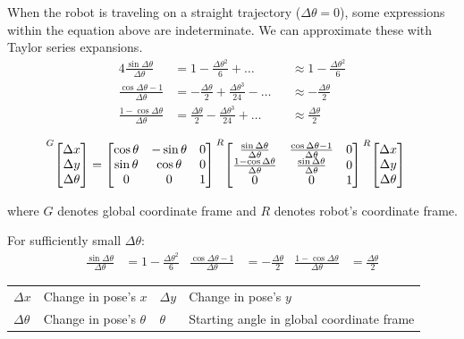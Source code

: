 When the robot is traveling on a straight trajectory ($\Delta\theta = 0$), some
expressions within the equation above are indeterminate. We can approximate
these with Taylor series expansions.
\begin{alignat*}{4}
  \frac{\sin\Delta\theta}{\Delta\theta}
    &= 1 - \frac{\Delta\theta^2}{6} + \ldots
    &&\approx 1 - \frac{\Delta\theta^2}{6} \\
  \frac{\cos\Delta\theta - 1}{\Delta\theta}
    &= -\frac{\Delta\theta}{2} + \frac{\Delta\theta^3}{24} - \ldots
    &&\approx -\frac{\Delta\theta}{2} \\
  \frac{1 - \cos\Delta\theta}{\Delta\theta}
    &= \frac{\Delta\theta}{2} - \frac{\Delta\theta^3}{24} + \ldots
    &&\approx \frac{\Delta\theta}{2}
\end{alignat*}
\begin{theorem}
  \begin{align}
    \prescript{G}{}{\begin{bmatrix}
      \Delta x \\
      \Delta y \\
      \Delta \theta
    \end{bmatrix}} &=
    \begin{bmatrix}
      \cos\theta & -\sin\theta & 0 \\
      \sin\theta &  \cos\theta & 0 \\
               0 &           0 & 1
    \end{bmatrix}
    \prescript{R}{}{\begin{bmatrix}
      \frac{\sin\Delta\theta}{\Delta\theta} &
        \frac{\cos\Delta\theta - 1}{\Delta\theta} & 0 \\
      \frac{1 - \cos\Delta\theta}{\Delta\theta} &
        \frac{\sin\Delta\theta}{\Delta\theta} & 0 \\
      0 & 0 & 1
    \end{bmatrix}}
    \prescript{R}{}{\begin{bmatrix}
      \Delta x \\
      \Delta y \\
      \Delta\theta
    \end{bmatrix}}
  \end{align}

  where $G$ denotes global coordinate frame and $R$ denotes robot's coordinate
  frame.

  For sufficiently small $\Delta\theta$:
  \begin{align}
    \frac{\sin\Delta\theta}{\Delta\theta} &= 1 - \frac{\Delta\theta^2}{6} &
    \frac{\cos\Delta\theta - 1}{\Delta\theta} &= -\frac{\Delta\theta}{2} &
    \frac{1 - \cos\Delta\theta}{\Delta\theta} &= \frac{\Delta\theta}{2}
  \end{align}
  \begin{figurekey}
    \begin{tabular}{llll}
      $\Delta x$ & Change in pose's $x$ & $\Delta y$ & Change in pose's $y$ \\
      $\Delta \theta$ & Change in pose's $\theta$ & $\theta$ & Starting angle in
        global coordinate frame
    \end{tabular}
  \end{figurekey}


\end{theorem}
